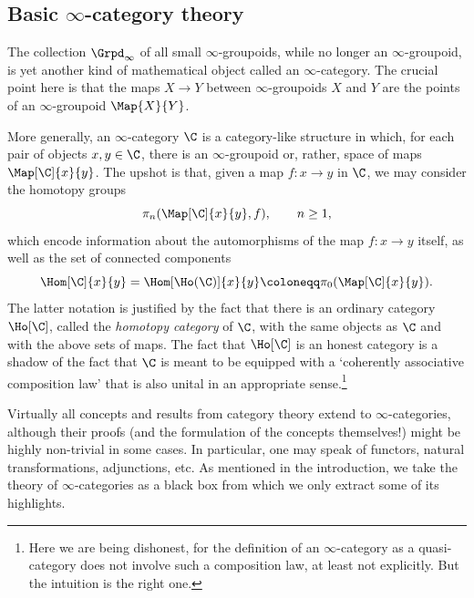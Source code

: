 \documentclass[a4paper]{amsart}
\begin{document}
\subsection{Basic $\infty$-category theory}

The collection $\Grpd_\infty$ of all small $\infty$-groupoids, while no longer
an $\infty$-groupoid, is yet another kind of mathematical object called an
$\infty$-category. The crucial point here is that the maps $X\to Y$ between
$\infty$-groupoids $X$ and $Y$ are the points of an $\infty$-groupoid
$\Map{X}{Y}$.

More generally, an $\infty$-category $\C$ is a category-like structure in which,
for each pair of objects $x,y\in\C$, there is an $\infty$-groupoid or, rather,
space of maps $\Map[\C]{x}{y}$. The upshot is that, given a map $f\colon x\to y$
in $\C$, we may consider the homotopy groups
\[
  \pi_n(\Map[\C]{x}{y},f),\qquad n\geq1,
\]
which encode information about the automorphisms of the map $f\colon x\to y$
itself, as well as the set of connected components
\[
  \Hom[\C]{x}{y}=\Hom[\Ho(\C)]{x}{y}\coloneqq\pi_0(\Map[\C]{x}{y}).
\]
The latter notation is justified by the fact that there is an ordinary category
$\Ho[\C]$, called the \emph{homotopy category} of $\C$, with the same objects as
$\C$ and with the above sets of maps. The fact that $\Ho[\C]$ is an honest
category is a shadow of the fact that $\C$ is meant to be equipped with a
`coherently associative composition law' that is also unital in an appropriate
sense.\footnote{Here we are being dishonest, for the definition of an
  $\infty$-category as a quasi-category does not involve such a composition
  law, at least not explicitly. But the intuition is the right one.}

\begin{remark}
  Virtually all concepts and results from category theory extend to
  $\infty$-categories, although their proofs (and the formulation of the
  concepts themselves!) might be highly non-trivial in some cases. In
  particular, one may speak of functors, natural transformations, adjunctions,
  etc. As mentioned in the introduction, we take the theory of $\infty$-categories
  as a black box from which we only extract some of its highlights.
\end{remark}
\end{document}
